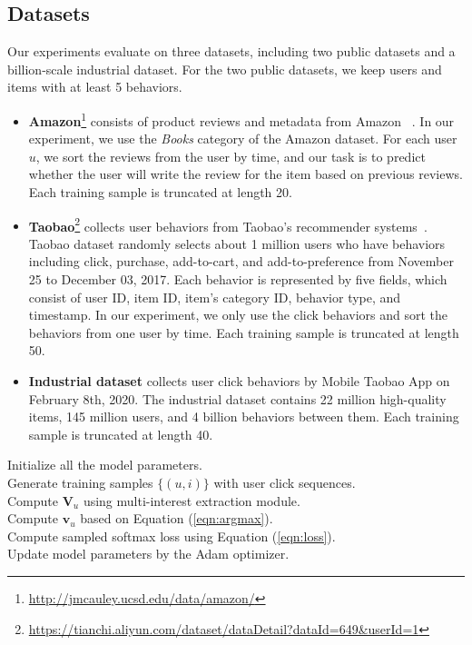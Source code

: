 \subsection{Datasets}
Our experiments evaluate on three datasets, including two public datasets and a billion-scale industrial dataset. For the two public datasets, we keep users and items with at least 5 behaviors. 

\begin{itemize}
    \item \textbf{Amazon}\footnote{\url{http://jmcauley.ucsd.edu/data/amazon/}} consists of product reviews and metadata from Amazon ~\cite{mcauley2015image,he2016ups}. In our experiment, we use the \textit{Books} category of the Amazon dataset. For each user $u$, we sort the reviews from the user by time, and our task is to predict whether the user will write the review for the item based on previous reviews. Each training sample is truncated at length 20.
    \item \textbf{Taobao}\footnote{\url{https://tianchi.aliyun.com/dataset/dataDetail?dataId=649\&userId=1}} collects user behaviors from Taobao's recommender systems~\cite{zhu2018learning}. Taobao dataset randomly selects about 1 million users who have behaviors including click, purchase, add-to-cart, and add-to-preference from November 25 to December 03, 2017. Each behavior is represented by five fields, which consist of user ID, item ID, item's category ID, behavior type, and timestamp. In our experiment, we only use the click behaviors and sort the behaviors from one user by time. Each training sample is truncated at length 50.
    \item \textbf{Industrial dataset} collects user click behaviors by Mobile Taobao App on February 8th, 2020. The industrial dataset contains 22 million high-quality items, 145 million users, and 4 billion behaviors between them. Each training sample is truncated at length 40.
\end{itemize}

\begin{algorithm}[t]
	\caption{\model \label{algo:training}}
	Initialize all the model parameters. \\
	Generate training samples $\{(u,i)\}$ with user click sequences.\\
	 {
		 {
			Compute $\mathbf{V}_u$ using multi-interest extraction module. \\
			Compute $\mathbf{v}_u$ based on Equation (\ref{eqn:argmax}). \\
			Compute sampled softmax loss using Equation (\ref{eqn:loss}). \\
			Update model parameters by the Adam optimizer.
		}
	}
\end{algorithm}




